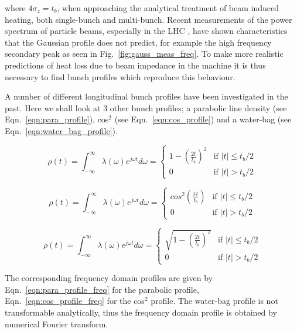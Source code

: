 \documentclass{cernrep}
\begin{document}
where $4\sigma_{z} = t_{b}$, when approaching the analytical treatment of beam induced heating, both single-bunch and multi-bunch. Recent measurements of the power spectrum of particle beams, especially in the LHC \cite{Baudrenghien:LHCPowSpec}, have shown characteristics that the Gaussian profile does not predict, for example the high frequency secondary peak as seen in Fig.~\ref{fig:gauss_meas_freq}. To make more realistic predictions of heat loss due to beam impedance in the machine it is thus necessary to find bunch profiles which reproduce this behaviour.

A number of different longitudinal bunch profiles have been investigated in the past. Here we shall look at 3 other bunch profiles; a parabolic line density (see Eqn.~\ref{eqn:para_profile}), cos$^{2}$ (see Eqn.~\ref{eqn:cos_profile}) and a water-bag (see Eqn.~\ref{eqn:water_bag_profile}).

\begin{equation}
\rho\left( t \right) = \int^{\infty}_{-\infty} \lambda \left( \omega \right) e^{j\omega t} d\omega = 
\begin{cases}1-\left( \frac{2t} {t_{b}} \right)^{2} &\textrm{if $| t | \leq t_{b}/2$}\\
0								&\textrm{if $| t | > t_{b}/2$}
\end{cases}
\label{eqn:para_profile}
\end{equation}

\begin{equation}
\rho\left( t \right) = \int^{\infty}_{-\infty} \lambda \left( \omega \right) e^{j\omega t} d\omega = 
\begin{cases}
cos^{2}\left( \frac{\pi t} {t_{b}} \right) &\textrm{if $| t | \leq t_{b}/2$}\\
0								&\textrm{if $| t | > t_{b}/2$}
\end{cases}
\label{eqn:cos_profile}
\end{equation}

\begin{equation}
\rho\left( t \right) = \int^{\infty}_{-\infty} \lambda \left( \omega \right) e^{j\omega t} d\omega = 
\begin{cases}
\sqrt{1-\left( \frac{2t}{t_{b}}\right)^{2}} &\textrm{if $| t | \leq t_{b}/2$}\\
0								&\textrm{if $| t | > t_{b}/2$}
\end{cases}
\label{eqn:water_bag_profile}
\end{equation}

The corresponding frequency domain profiles are given by Eqn.~\ref{eqn:para_profile_freq} for the parabolic profile, Eqn.~\ref{eqn:cos_profile_freq} for the cos$^{2}$ profile. The water-bag profile is not transformable analytically, thus the frequency domain profile is obtained by numerical Fourier transform.
\end{document}
